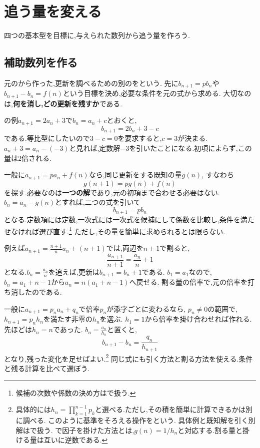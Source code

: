 \section{追う量を変える}\label{節：追う量を変える}
四つの基本型を目標に,与えられた数列から追う量を作ろう.

  \subsection{補助数列を作る}\label{節：補助数列の設計}
    元のから作った,更新を調べるための別のを\textbf{}という.
    先に$b_{n+1}=pb_n$や$b_{n+1}-b_n=f(n)$という目標を決め,必要な条件を元の式から求める.
    大切なのは,\textbf{何を消し,どの更新を残すか}である.

    の例$a_{n+1}=2a_n+3$で$b_n=a_n+c$とおくと,
    \[
      b_{n+1}=2b_n+3-c
    \]
    である.等比型にしたいので$3-c=0$を要求すると,$c=3$が決まる.
    $a_n+3=a_n-(-3)$と見れば,定数解$-3$を引いたことになる.初項によらず,この量は$2$倍される.

    一般に$a_{n+1}=pa_n+f(n)$なら,同じ更新をする既知の量$g(n)$,
    すなわち
    \[
      g(n+1)=pg(n)+f(n)
    \]
    を探す.必要なのは\textbf{一つの解}であり,元の初項まで合わせる必要はない.
    $b_n=a_n-g(n)$とすれば,二つの式を引いて
    \[
      b_{n+1}=pb_n
    \]
    となる.定数項には定数,一次式には一次式を候補にして係数を比較し,条件を満たせなければ選び直す.\footnote{候補の次数や係数の決め方はで扱う.}
    ただし,その量を簡単に求められるとは限らない.

    例えば$a_{n+1}=\frac{n+1}{n}a_n+(n+1)$では,両辺を$n+1$で割ると,
    \[
      \frac{a_{n+1}}{n+1}=\frac{a_n}{n}+1
    \]
    となる.$b_n=\frac{a_n}{n}$を追えば,更新は$b_{n+1}=b_n+1$である.
    $b_1=a_1$なので,$b_n=a_1+n-1$から$a_n=n(a_1+n-1)$へ戻せる.
    割る量の倍率で,元の倍率を打ち消したのである.

    一般に$a_{n+1}=p_na_n+q_n$で倍率$p_n$が添字ごとに変わるなら,
    $p_n\ne0$の範囲で,$h_{n+1}=p_nh_n$を満たす非零の$h_n$を選ぶ.
    $h_1=1$から倍率を掛け合わせれば作れる.先ほどは$h_n=n$であった.
    $b_n=\frac{a_n}{h_n}$と置くと,
    \[
      b_{n+1}-b_n=\frac{q_n}{h_{n+1}}
    \]
    となり,残った変化を足せばよい.\footnote{具体的には$h_n=\prod_{k=1}^{n-1}p_k$と選べる.ただし,その積を簡単に計算できるかは別に調べる.
    このように基準をそろえる操作を\textbf{}という.
    具体例と既知解を引く別解はで扱う.
    で因子を掛けた方法とは,$g(n)=1/h_n$と対応する.割る量と掛ける量は互いに逆数である.}
    同じ式にも引く方法と割る方法を使える.条件と残る計算を比べて選ぼう.

